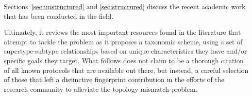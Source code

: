 \documentclass[acmcsur,acmnow]{acmtrans2m}
\begin{document}
Sections~\ref{sec:unstructured} and \ref{sec:structured} discuss the recent academic work that has been conducted in the field.

Ultimately, it reviews the most important resources found in the literature that attempt to tackle the problem as it proposes a taxonomic scheme, using a set of supertype-subtype relationships based on unique characteristics they have and/or specific goals they target. What follows does not claim to be a thorough citation of all known protocols that are available out there, but instead, a careful selection of those that left a distinctive fingerprint contribution in the efforts of the research community to alleviate the topology mismatch problem.

\end{document}
